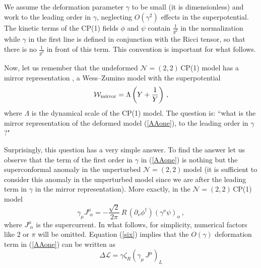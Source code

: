 \documentclass[epsfig,12pt]{article}
\def\beq{\begin{equation}}
\def\eeq{\end{equation}}
\def\beqn{\begin{eqnarray}}
\def\eeqn{\end{eqnarray}}
\newcommand{\ntt}{${\mathcal N}=(2,2)\,$}
\def\beqn{\begin{eqnarray}}
\def\eeqn{\end{eqnarray}}
\def\beq{\begin{equation}}
\def\eeq{\end{equation}}
\begin{document}
{We assume the deformation parameter $\gamma$ to be small (it is dimensionless)
and work to the leading order in $\gamma$, neglecting $O(\gamma^2)$ effects in the superpotential.
The kinetic terms of the CP(1) fields $\phi$ and $\psi$ contain $\frac{1}{g^2}$ in the normalization
while $\gamma$ in the first line is defined in conjunction with the Ricci tensor, so that there is no $\frac{1}{g^2}$
in front of this term. This convention is important for what follows.

Now, let us remember that the undeformed \ntt  CP(1) model has a mirror representation \cite{MR1,MR2},
a Wess--Zumino model with the superpotential
\beq
{\mathcal W}_{\rm mirror} = \Lambda \left( Y + \frac{1}{Y}\right)\,,
\label{AABone}
\eeq
where $\Lambda$ is the dynamical scale of the CP(1) model.
The question is: ``what is the mirror representation of the deformed model (\ref{AAone}), to the leading order in $\gamma$?"

Surprisingly, this question has a very simple answer.
To find the answer let us observe that the term of the first order in $\gamma$ in (\ref{AAone})
is nothing but the superconformal anomaly in the unperturbed \ntt  model (it is sufficient to consider this anomaly in the unperturbed model since we are after the leading term in $\gamma$ in the mirror representation).
More exactly, in the
\ntt  CP(1) model \cite{ls,ls1}
\beq
\gamma_\mu J^\mu_{\,\,\alpha} = -\frac{ \sqrt 2}{2\pi}\,R\, \left(\partial_\nu \phi^\dagger\right)\left(
\gamma^\nu\psi\right)_\alpha\,,
\label{six}
\eeq
where $J^\mu_{\,\,\alpha}$ is the supercurrent.
In what follows, for simplicity,  numerical factors like $2$ or $\pi$ will be omitted. Equation (\ref{six})
implies that the $O(\gamma )$ deformation term in (\ref{AAone}) can be written as
\beq
\Delta {\mathcal L} = \gamma \zeta_R\left(\gamma_\mu \, J^\mu\right)_L
\label{seven}
\eeq 

}
\end{document}

